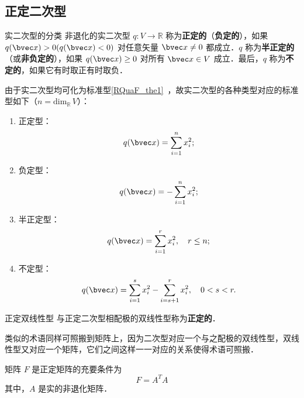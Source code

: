 
\begin{issues}
\issueDraft
\end{issues}

\subsection{正定二次型}
\begin{definition}{实二次型的分类}
非退化的实二次型 $q:V\rightarrow\mathbb R$ 称为\textbf{正定的}（\textbf{负定的}），如果 $q(\bvec x)>0(q(\bvec x)<0)$ 对任意矢量 $\bvec x\neq0$ 都成立．$q$ 称为\textbf{半正定的}（或\textbf{非负定的}），如果 $q(\bvec x)\geq0$ 对所有 $\bvec x\in V$ 成立．最后，$q$ 称为\textbf{不定的}，如果它有时取正有时取负．
\end{definition}
由于实二次型均可化为标准型\autoref{RQuaF_the1}~，故实二次型的各种类型对应的标准型如下（$n=\mathrm{dim}_\mathbb R \,V$）：
\begin{enumerate}
\item 正定型：\begin{equation}\label{DeQua_eq1}
q(\bvec x)=\sum_{i=1}^n x_i^2;
\end{equation}
\item 负定型：\begin{equation}
q(\bvec x)=-\sum_{i=1}^n x_i^2;
\end{equation}
\item 半正定型：\begin{equation}
q(\bvec x)=\sum_{i=1}^r x_i^2,\quad r\leq n;
\end{equation}
\item 不定型：\begin{equation}
q(\bvec x)=\sum_{i=1}^s x_i^2-\sum_{i=s+1}^r x_i^2,\quad0<s< r.
\end{equation}
\end{enumerate}
\begin{definition}{正定双线性型}
与正定二次型相配极的双线性型称为\textbf{正定的}．
\end{definition}
类似的术语同样可照搬到矩阵上，因为二次型对应一个与之配极的双线性型，双线性型又对应一个矩阵，它们之间这样一一对应的关系使得术语可照搬．
\begin{theorem}{}
矩阵 $F$ 是正定矩阵的充要条件为
\begin{equation}
F=A^TA
\end{equation}
其中，$A$ 是实的非退化矩阵．
\end{theorem}
